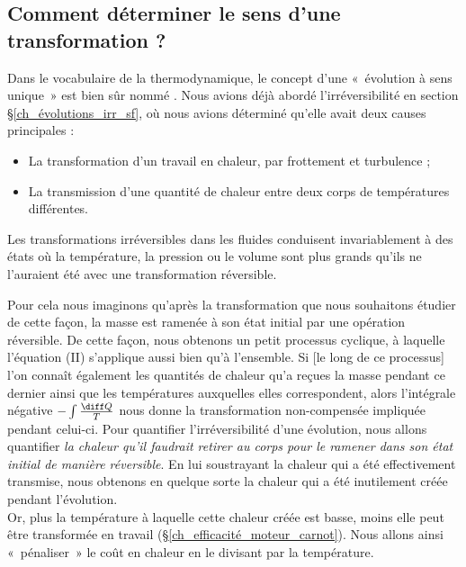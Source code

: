 	\subsection{Comment déterminer le sens d’une transformation ?}
	
		Dans le vocabulaire de la thermodynamique, le concept d’une «~évolution à sens unique~» est bien sûr nommé . Nous avions déjà abordé l'irréversibilité en section \S\ref{ch_évolutions_irr_sf}, où nous avions déterminé qu’elle avait deux causes principales :
			\begin{itemize}
				\item La transformation d’un travail en chaleur, par frottement et turbulence ;
				\item La transmission d’une quantité de chaleur entre deux corps de températures différentes.
			\end{itemize}
		
		Les transformations irréversibles dans les fluides conduisent invariablement à des états où la température, la pression ou le volume sont plus grands qu’ils ne l’auraient été avec une transformation réversible.
		
			Pour cela nous imaginons qu’après la transformation que nous souhaitons étudier de cette façon, la masse est ramenée à son état initial par une opération réversible. De cette façon, nous obtenons un petit processus cyclique, à laquelle l’équation (II) s’applique aussi bien qu’à l’ensemble. Si [le long de ce processus] l’on connaît également les quantités de chaleur qu’a reçues la masse pendant ce dernier ainsi que les températures auxquelles elles correspondent, alors l’intégrale négative $-\int \frac{\diff Q}{T}$ nous donne la transformation non-compensée impliquée pendant celui-ci.
		Pour quantifier l’irréversibilité d’une évolution, nous allons quantifier \emph{la chaleur qu’il faudrait retirer au corps pour le ramener dans son état initial de manière réversible}. En lui soustrayant la chaleur qui a été effectivement transmise, nous obtenons en quelque sorte la chaleur qui a été inutilement créée pendant l’évolution.\\
		Or, plus la température à laquelle cette chaleur créée est basse, moins elle peut être transformée en travail (\S\ref{ch_efficacité_moteur_carnot}). Nous allons ainsi «~pénaliser~» le coût en chaleur en le divisant par la température.
		
